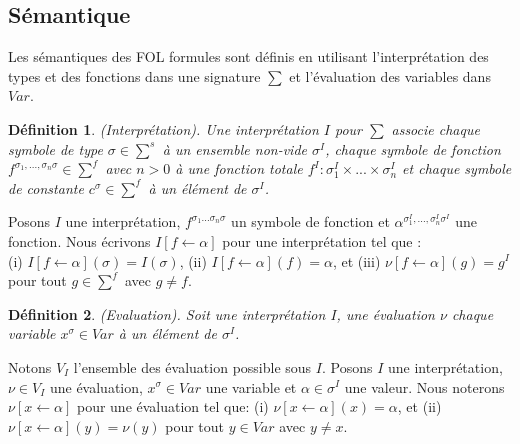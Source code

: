\documentclass[9pt]{book}
\newtheorem{definition}{D\'efinition}[section]
\begin{document}
	\subsection{S\'emantique}
	Les s\'emantiques des FOL formules sont d\'efinis en utilisant l'interpr\'etation des types et des fonctions dans une signature $\sum$ et l'\'evaluation des variables dans $Var$.
\begin{definition}
(Interpr\'etation). Une interpr\'etation $I$ pour $\sum$ associe chaque symbole de type $\sigma \in \sum^{s}$ \`a un ensemble non-vide $\sigma^{I}$, chaque symbole de fonction $f^{\sigma_{1},...,\sigma_{n}\sigma} \in \sum^{f}$ avec $n > 0$ \`a une fonction totale $f^{I} : \sigma_{1}^{I}\times ... \times \sigma_{n}^{I}$ et chaque symbole de constante $c^{\sigma} \in \sum^{f}$ \`a un \'el\'ement de $\sigma^{I}$.
\end{definition}
	Posons $I$ une interpr\'etation, $f^{\sigma_{1} ...\sigma_{n} \sigma}$ un symbole de fonction et $\alpha^{\sigma_{1}^{I},...,\sigma_{n}^{I}\sigma^{I}}$ une fonction. Nous \'ecrivons $I[f \leftarrow \alpha]$ pour une interpr\'etation tel que : \\(i) $I[f\leftarrow\alpha](\sigma) = I(\sigma)$, (ii) $I[f\leftarrow\alpha](f) = \alpha$, et (iii) $\nu[f\leftarrow\alpha](g) = g^{I}$ pour tout $g \in \sum^{f}$ avec $g\neq f$.
	
\begin{definition}
(Evaluation). Soit une interpr\'etation $I$, une \'evaluation $\nu$ chaque variable $x^{\sigma} \in Var$ \`a un \'el\'ement de $\sigma^{I}$.
\end{definition}
Notons $V_{I}$ l'ensemble des \'evaluation possible sous $I$.
Posons $I$ une interpr\'etation, $\nu \in V_{I}$ une \'evaluation, $x^{\sigma} \in Var$ une variable et $\alpha \in \sigma^{I}$ une valeur. Nous noterons $\nu[x\leftarrow\alpha]$ pour une \'evaluation tel que: (i) $\nu[x\leftarrow\alpha](x) = \alpha$, et (ii) $\nu[x\leftarrow\alpha](y)=\nu(y)$ pour tout $y\in Var$ avec $y\neq x$.
\end{document}
